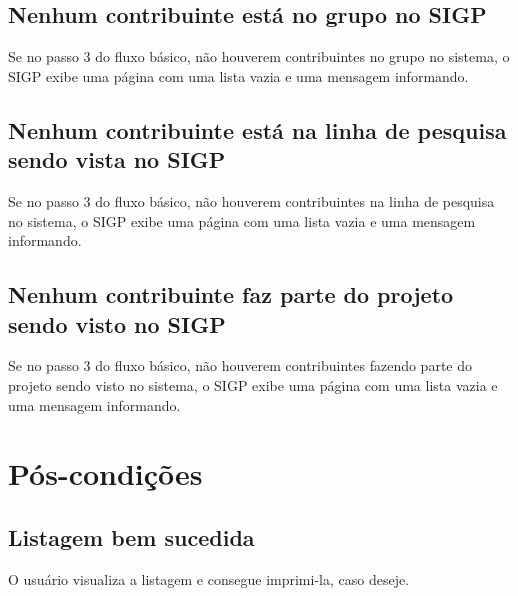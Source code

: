 \documentclass[11pt, a4paper,oneside]{book}
\begin{document}
\subsection{Nenhum contribuinte está no grupo no SIGP}
Se no passo $3$ do fluxo básico, não houverem contribuintes no grupo no sistema, o SIGP exibe uma página com uma lista vazia e uma mensagem informando.

\subsection{Nenhum contribuinte está na linha de pesquisa sendo vista no SIGP}
Se no passo $3$ do fluxo básico, não houverem contribuintes na linha de pesquisa no sistema, o SIGP exibe uma página com uma lista vazia e uma mensagem informando.

\subsection{Nenhum contribuinte faz parte do projeto sendo visto no SIGP}
Se no passo $3$ do fluxo básico, não houverem contribuintes fazendo parte do projeto sendo visto no sistema, o SIGP exibe uma página com uma lista vazia e uma mensagem informando.

%
%
%
%

\section{Pós-condições}

\subsection{Listagem bem sucedida}

O usuário visualiza a listagem e consegue imprimi-la, caso deseje.

%
\end{document}
